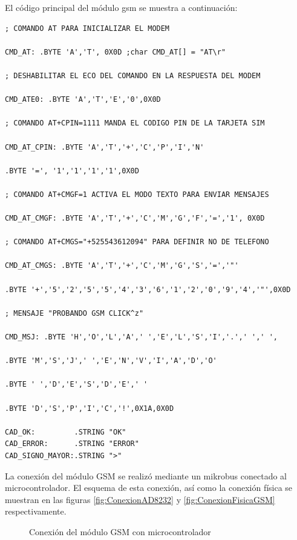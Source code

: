 El código principal del módulo gsm se muestra a continuación:
{\small 
\begin{lstlisting}[frame=single]
; COMANDO AT PARA INICIALIZAR EL MODEM

CMD_AT: .BYTE 'A','T', 0X0D	;char CMD_AT[] = "AT\r"

; DESHABILITAR EL ECO DEL COMANDO EN LA RESPUESTA DEL MODEM

CMD_ATE0: .BYTE 'A','T','E','0',0X0D

; COMANDO AT+CPIN=1111 MANDA EL CODIGO PIN DE LA TARJETA SIM

CMD_AT_CPIN: .BYTE 'A','T','+','C','P','I','N'

.BYTE '=', '1','1','1','1',0X0D

; COMANDO AT+CMGF=1 ACTIVA EL MODO TEXTO PARA ENVIAR MENSAJES

CMD_AT_CMGF: .BYTE 'A','T','+','C','M','G','F','=','1', 0X0D

; COMANDO AT+CMGS="+525543612094" PARA DEFINIR NO DE TELEFONO

CMD_AT_CMGS: .BYTE 'A','T','+','C','M','G','S','=','"'

.BYTE '+','5','2','5','5','4','3','6','1','2','0','9','4','"',0X0D

; MENSAJE "PROBANDO GSM CLICK^z"

CMD_MSJ: .BYTE 'H','O','L','A',' ','E','L','S','I','.',' ',' ',

.BYTE 'M','S','J',' ','E','N','V','I','A','D','O'

.BYTE ' ','D','E','S','D','E',' '

.BYTE 'D','S','P','I','C','!',0X1A,0X0D

CAD_OK:         .STRING "OK"
CAD_ERROR:      .STRING "ERROR"
CAD_SIGNO_MAYOR:.STRING ">"
\end{lstlisting}
}
La conexión del módulo GSM se realizó mediante un mikrobus conectado al microcontrolador. El esquema de esta conexión, así como la conexión física se muestran en las figuras \ref{fig:ConexionAD8232} y \ref{fig:ConexionFisicaGSM} respectivamente.

	\begin{figure}[htbp!]
		\centering
		\caption{Conexión del módulo GSM con microcontrolador}
		\label{fig:ConexionGSM}
	\end{figure}
	
